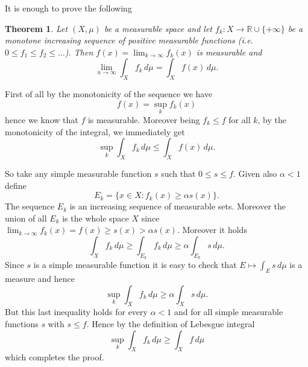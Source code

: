 \documentclass[12pt]{article}
\newtheorem{theorem}{Theorem}
\begin{document}
It is enough to prove the following

\begin{theorem}
Let $(X,\mu)$ be a measurable space and let $f_k\colon X\to {\mathbb R}\cup\{+\infty\}$ 
be a monotone increasing sequence of positive measurable functions (i.e. $0\le f_1 \le f_2 \le \ldots$). Then $f(x)=\lim_{k\to \infty} f_k(x)$ is measurable and
\[
  \lim_{n\to\infty} \int_X f_k\, d\mu = \int_{X} f(x) \, d\mu.
\]
\end{theorem}

First of all by the monotonicity of the sequence we have
\[
  f(x)= \sup_k f_k(x)
\]
hence we know that $f$ is measurable. Moreover being $f_k\le f$ for all $k$, by the monotonicity of the integral, we immediately get
\[
  \sup_k \int_X f_k\, d\mu \le \int_X f(x)\, d\mu.
\]

So take any simple measurable function $s$ such that $0\le s \le f$. Given also $\alpha<1$ define
\[
  E_k = \{ x \in X \colon f_k(x) \ge \alpha s(x)\}.
\]
The sequence $E_k$ is an increasing sequence of measurable sets. Moreover the union of all $E_k$ is the whole space $X$ since 
$\lim_{k\to\infty} f_k(x)=f(x) \ge s(x) > \alpha s(x)$. Moreover it holds
\[
  \int_X f_k\, d\mu \ge \int_{E_k} f_k\, d\mu \ge \alpha\int_{E_k} s\, d\mu.
\]
Since $s$ is a simple measurable function it is easy to check that 
$E\mapsto \int_E s\, d\mu$ is a measure and hence
\[
  \sup_k \int_X f_k\, d\mu \ge \alpha \int_X s\, d\mu.
\]
But this last inequality holds for every $\alpha<1$ and for all simple measurable functions $s$ with $s\le f$. Hence by the definition of Lebesgue integral
\[
  \sup_k \int_X f_k \, d\mu \ge \int_X f\, d\mu
\]
which completes the proof.
\end{document}
